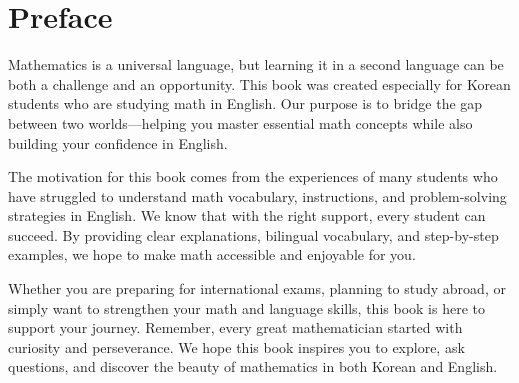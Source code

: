 \section*{Preface}
Mathematics is a universal language, but learning it in a second 
language can be both a challenge and an opportunity. This book was 
created especially for Korean students who are studying math in 
English. Our purpose is to bridge the gap between two worlds—helping 
you master essential math concepts while also building your 
confidence in English.

The motivation for this book comes from the experiences of many 
students who have struggled to understand math vocabulary, 
instructions, and problem-solving strategies in English. We 
know that with the right support, every student can succeed. 
By providing clear explanations, bilingual vocabulary, and 
step-by-step examples, we hope to make math accessible and 
enjoyable for you.

Whether you are preparing for international exams, planning to 
study abroad, or simply want to strengthen your math and language 
skills, this book is here to support your journey. Remember, 
every great mathematician started with curiosity and perseverance. 
We hope this book inspires you to explore, ask questions, 
and discover the beauty of mathematics in both Korean and English.
